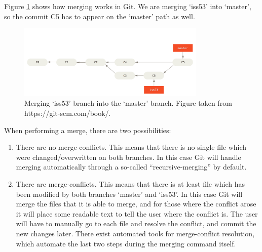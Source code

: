 \documentclass[12pt,twoside,notitlepage]{report}
\begin{document}
Figure \ref{basic-merging_git} shows how merging works in Git. We are merging `iss53' into `master', so the commit C5 has to appear on the `master' path as well.
\begin{figure}[ht!]
\includegraphics[width=0.8\textwidth]{basic-merging_git.png}
\centering

\captionsetup{width=0.8\textwidth}
\caption[Merging branches in Git]{Merging `iss53' branch into the `master' branch. Figure taken from https://git-scm.com/book/.}
\label{basic-merging_git}
\end{figure}

When performing a merge, there are two possibilities:
\begin{enumerate}
\item There are no merge-conflicts. This means that there is no single file which were changed/overwritten on both branches. In this case Git will handle merging automatically through a so-called ``recursive-merging'' by default.
\item There are merge-conflicts. This means that there is at least file which has been modified by both branches `master' and `iss53'. In this case Git will merge the files that it is able to merge, and for those where the conflict arose it will place some readable text to tell the user where the conflict is. The user will have to manually go to each file and resolve the conflict, and commit the new changes later. There exist automated tools for merge-conflict resolution, which automate the last two steps during the merging command itself.
\end{enumerate}
\end{document}
